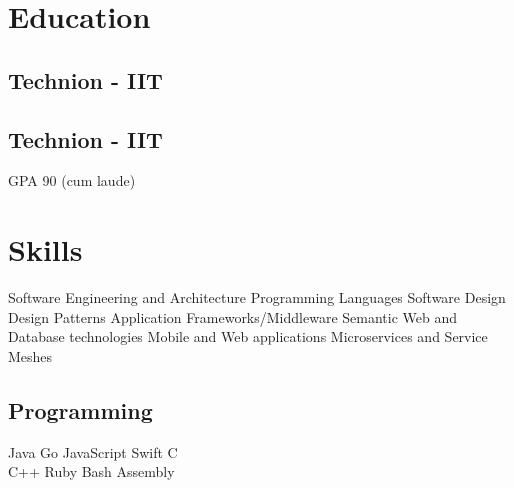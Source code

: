 \documentclass[]{deedy-resume}
\begin{document}
%
%

%
%


%
%

\begin{minipage}[t]{0.33\textwidth}


\section{Education}

\subsection{Technion - IIT}
\sectionsep
\subsection{Technion - IIT}
GPA 90 (cum laude)
\sectionsep


\section{Skills}
Software Engineering and Architecture \textbullet{} Programming Languages \textbullet{} Software Design \textbullet{} Design Patterns \textbullet{} Application Frameworks/Middleware \textbullet{} Semantic Web and Database technologies \textbullet{} Mobile and Web applications \textbullet{} Microservices and Service Meshes
\sectionsep

\subsection{Programming}
Java \textbullet{} Go \textbullet{} JavaScript \textbullet{} Swift \textbullet{} C\\
C++ \textbullet{} Ruby  \textbullet{}  Bash \textbullet{}  Assembly
\sectionsep


\end{minipage}
\end{document}
